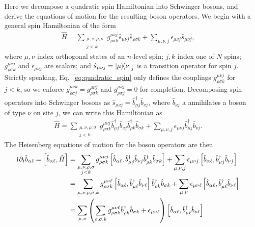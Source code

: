 \documentclass[aps,pra,nofootinbib,twocolumn,superscriptaddress]{revtex4-2}
\newcommand{\p}[1]{\left(#1\right)} %
\renewcommand{\sp}[1]{\left[#1\right]} %
\renewcommand{\i}{\mathrm{i}\mkern1mu} %
\newcommand{\1}{\mathds{1}}
\renewcommand{\b}{\hat{b}}
\newcommand{\s}{\hat{s}}
\renewcommand{\H}{\hat{H}}
\begin{document}
Here we decompose a quadratic spin Hamiltonian into Schwinger bosons, and derive the equations of motion for the resulting boson operators.
We begin with a general spin Hamiltonian of the form
\begin{align}
  \H = \sum_{\substack{\mu,\nu,\rho,\sigma\\j<k}}
  g^{\mu\nu j}_{\rho\sigma k} \s_{\mu\nu j} \s_{\rho\sigma k}
  + \sum_{\mu,\nu,j} \epsilon_{\mu\nu j} \s_{\mu\nu j},
  \label{eq:quadratic_spin}
\end{align}
where $\mu,\nu$ index orthogonal states of an $n$-level spin; $j,k$ index one of $N$ spins; $g^{\mu\nu j}_{\rho\sigma k}$ and $\epsilon_{\mu\nu j}$ are scalars; and $\s_{\mu\nu j}=\op{\mu}{\nu}_j$ is a transition operator for spin $j$.
Strictly speaking, Eq.~\eqref{eq:quadratic_spin} only defines the couplings $g^{\mu\nu j}_{\rho\sigma k}$ for $j<k$, so we enforce $g^{\mu\nu k}_{\rho\sigma j}=g^{\mu\nu j}_{\rho\sigma k}$ and $g^{\mu\nu j}_{\rho\sigma j}=0$ for completion.
Decomposing spin operators into Schwinger bosons as $\s_{\mu\nu j}=\b_{\mu j}^\dag \b_{\nu j}$, where $\b_{\nu j}$ a annihilates a boson of type $\nu$ on site $j$, we can write this Hamiltonian as
\begin{align}
  \H = \sum_{\substack{\mu,\nu,\rho,\sigma\\j<k}}
  g^{\mu\nu j}_{\rho\sigma k}
  \b_{\mu j}^\dag \b_{\nu j} \b_{\rho k}^\dag \b_{\sigma k}
  + \sum_{\mu,\nu,j} \epsilon_{\mu\nu j} \b_{\mu j}^\dag \b_{\nu j}.
\end{align}
The Heisenberg equations of motion for the boson operators are then
\begin{align}
  \i \partial_t \b_{\alpha\ell} = \sp{\b_{\alpha\ell}, \H}
  &= \sum_{\substack{\mu,\nu,\rho,\sigma\\j<k}}
  g^{\mu\nu j}_{\rho\sigma k}
  \sp{\b_{\alpha\ell}, \b_{\mu j}^\dag \b_{\nu j} \b_{\rho k}^\dag \b_{\sigma k}}
  + \sum_{\mu,\nu,j} \epsilon_{\mu\nu j}
  \sp{\b_{\alpha\ell}, \b_{\mu j}^\dag \b_{\nu j}} \\
  &= \sum_{\mu,\nu,\rho,\sigma,k} g^{\mu\nu\ell}_{\rho\sigma k}
  \sp{\b_{\alpha\ell}, \b_{\mu\ell}^\dag \b_{\nu\ell}}
  \b_{\rho k}^\dag \b_{\sigma k}
  + \sum_{\mu,\nu} \epsilon_{\mu\nu\ell}
  \sp{\b_{\alpha\ell}, \b_{\mu\ell}^\dag \b_{\nu\ell}} \\
  &= \sum_{\mu,\nu} \p{\sum_{\rho,\sigma,k}
    g^{\mu\nu\ell}_{\rho\sigma k} \b_{\rho k}^\dag \b_{\sigma k}
    + \epsilon_{\mu\nu\ell}}
  \sp{\b_{\alpha\ell}, \b_{\mu\ell}^\dag \b_{\nu\ell}}
\end{align}
\end{document}
